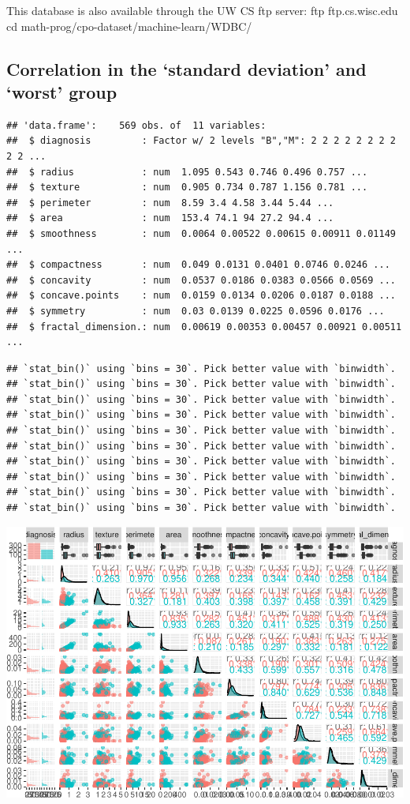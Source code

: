 \documentclass[
  11pt,
]{article}
\begin{document}
This database is also available through the UW CS ftp server: ftp
ftp.cs.wisc.edu cd math-prog/cpo-dataset/machine-learn/WDBC/

\hypertarget{correlation-in-the-standard-deviation-and-worst-group}{%
\subsection{Correlation in the `standard deviation' and `worst'
group}\label{correlation-in-the-standard-deviation-and-worst-group}}

\begin{verbatim}
## 'data.frame':    569 obs. of  11 variables:
##  $ diagnosis         : Factor w/ 2 levels "B","M": 2 2 2 2 2 2 2 2 2 2 ...
##  $ radius            : num  1.095 0.543 0.746 0.496 0.757 ...
##  $ texture           : num  0.905 0.734 0.787 1.156 0.781 ...
##  $ perimeter         : num  8.59 3.4 4.58 3.44 5.44 ...
##  $ area              : num  153.4 74.1 94 27.2 94.4 ...
##  $ smoothness        : num  0.0064 0.00522 0.00615 0.00911 0.01149 ...
##  $ compactness       : num  0.049 0.0131 0.0401 0.0746 0.0246 ...
##  $ concavity         : num  0.0537 0.0186 0.0383 0.0566 0.0569 ...
##  $ concave.points    : num  0.0159 0.0134 0.0206 0.0187 0.0188 ...
##  $ symmetry          : num  0.03 0.0139 0.0225 0.0596 0.0176 ...
##  $ fractal_dimension.: num  0.00619 0.00353 0.00457 0.00921 0.00511 ...
\end{verbatim}

\begin{verbatim}
## `stat_bin()` using `bins = 30`. Pick better value with `binwidth`.
## `stat_bin()` using `bins = 30`. Pick better value with `binwidth`.
## `stat_bin()` using `bins = 30`. Pick better value with `binwidth`.
## `stat_bin()` using `bins = 30`. Pick better value with `binwidth`.
## `stat_bin()` using `bins = 30`. Pick better value with `binwidth`.
## `stat_bin()` using `bins = 30`. Pick better value with `binwidth`.
## `stat_bin()` using `bins = 30`. Pick better value with `binwidth`.
## `stat_bin()` using `bins = 30`. Pick better value with `binwidth`.
## `stat_bin()` using `bins = 30`. Pick better value with `binwidth`.
## `stat_bin()` using `bins = 30`. Pick better value with `binwidth`.
\end{verbatim}

\includegraphics{stat_DAP_files/figure-latex/unnamed-chunk-18-1.pdf}
\end{document}
